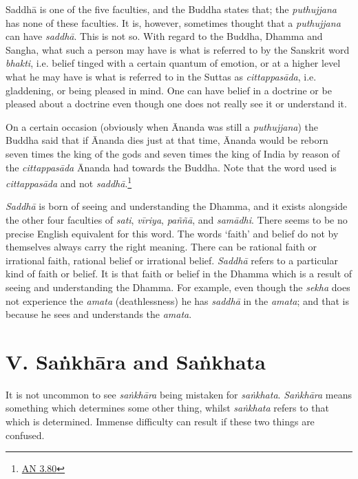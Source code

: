 Saddhā is one of the five faculties, and the Buddha states that; the \emph{puthujjana} has none of these faculties. It is, however, sometimes thought that a \emph{puthujjana} can have \emph{saddhā}. This is not so. With regard to the Buddha, Dhamma and Sangha, what such a person may have is what is referred to by the Sanskrit word \emph{bhakti}, i.e. belief tinged with a certain quantum of emotion, or at a higher level what he may have is what is referred to in the Suttas as \emph{cittappasāda}, i.e. gladdening, or being pleased in mind. One can have belief in a doctrine or be pleased about a doctrine even though one does not really see it or understand it.

On a certain occasion (obviously when Ānanda was still a \emph{puthujjana}) the Buddha said that if Ānanda dies just at that time, Ānanda would be reborn seven times the king of the gods and seven times the king of India by reason of the \emph{cittappasāda} Ānanda had towards the Buddha. Note that the word used is \emph{cittappasāda} and not \emph{saddhā}.\footnote{\href{https://suttacentral.net/an3.80/en/sujato}{AN 3.80}}

\emph{Saddhā} is born of seeing and understanding the Dhamma, and it exists alongside the other four faculties of \emph{sati}, \emph{vīriya}, \emph{paññā}, and \emph{samādhi}. There seems to be no precise English equivalent for this word. The words `faith' and belief do not by themselves always carry the right meaning. There can be rational faith or irrational faith, rational belief or irrational belief. \emph{Saddhā} refers to a particular kind of faith or belief. It is that faith or belief in the Dhamma which is a result of seeing and understanding the Dhamma. For example, even though the \emph{sekha} does not experience the \emph{amata} (deathlessness) he has \emph{saddhā} in the \emph{amata}; and that is because he sees and understands the \emph{amata}.

\hypertarget{_v_saux1e45khux101ra_and_saux1e45khata}{%
\section{V. Saṅkhāra and Saṅkhata}\label{_v_saux1e45khux101ra_and_saux1e45khata}}

It is not uncommon to see \emph{saṅkhāra} being mistaken for \emph{saṅkhata}. \emph{Saṅkhāra} means something which determines some other thing, whilst \emph{saṅkhata} refers to that which is determined. Immense difficulty can result if these two things are confused.

